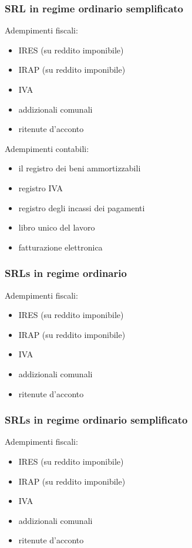 \documentclass{article}
\begin{document}
\subsubsection{SRL in regime ordinario semplificato}
Adempimenti fiscali:
\begin{itemize}
    \item IRES (su reddito imponibile)
    \item IRAP (su reddito imponibile)
    \item IVA
    \item addizionali comunali
    \item ritenute d'acconto
\end{itemize}

Adempimenti contabili:
\begin{itemize}
    \item il registro dei beni ammortizzabili
    \item registro IVA
    \item registro degli incassi dei pagamenti
    \item libro unico del lavoro
    \item fatturazione elettronica
\end{itemize}



\subsubsection{SRLs in regime ordinario}
Adempimenti fiscali:
\begin{itemize}
    \item IRES (su reddito imponibile)
    \item IRAP (su reddito imponibile)
    \item IVA
    \item addizionali comunali
    \item ritenute d'acconto
\end{itemize}



\subsubsection{SRLs in regime ordinario semplificato}
Adempimenti fiscali:
\begin{itemize}
    \item IRES (su reddito imponibile)
    \item IRAP (su reddito imponibile)
    \item IVA
    \item addizionali comunali
    \item ritenute d'acconto
\end{itemize}
\end{document}
